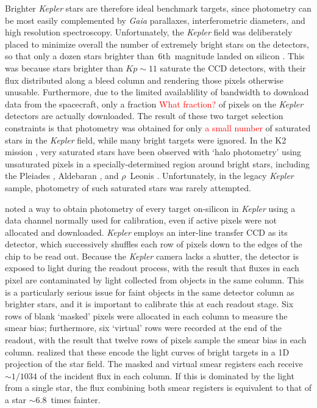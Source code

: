 \documentclass[a4paper,fleqn,usenatbib]{mnras}
\newcommand{\kepler}{\emph{Kepler}\xspace}
\newcommand{\gaia}{\emph{Gaia}\xspace}
\begin{document}
Brighter \kepler stars are therefore ideal benchmark targets, since photometry can be most easily complemented by \gaia parallaxes, interferometric diameters, and high resolution spectroscopy.  
Unfortunately, the \kepler field was deliberately placed to minimize overall the number of extremely bright stars on the detectors, so that only a dozen stars brighter than~6th~magnitude landed on silicon \citep{2010ApJ...713L..79K}. This was because stars brighter than $Kp \sim 11$ saturate the CCD detectors, with their flux distributed along a bleed column and rendering those pixels otherwise unusable. Furthermore, due to the limited availablility of bandwidth to download data from the spacecraft, only a fraction \textcolor{red}{What fraction?} of pixels on the \kepler detectors are actually downloaded. The result of these two target selection constraints is that photometry was obtained for only \textcolor{red}{a small number} of saturated stars in the \kepler field, while many bright targets were ignored. In the K2 mission \citep{k2early}, very saturated stars have been observed with `halo photometry' using unsaturated pixels in a specially-determined region around bright stars, including the Pleiades \citep{halo}, Aldebaran \citep{aldebaran}, and $\rho$~Leonis \citep{rholeo}. Unfortunately, in the legacy \kepler sample, photometry of such saturated stars was rarely attempted.

\citet{orig_smear} noted a way to obtain photometry of every target on-silicon in \kepler using a data channel normally used for calibration, even if active pixels were not allocated and downloaded. \kepler employs an inter-line transfer CCD as its detector, which successively shuffles each row of pixels down to the edges of the chip to be read out. Because the \kepler camera lacks a shutter, the detector is exposed to light during the readout process, with the result that fluxes in each pixel are contaminated by light collected from objects in the same column. This is a particularly serious issue for faint objects in the same detector column as brighter stars, and it is important to calibrate this at each readout stage. Six rows of blank `masked' pixels were allocated in each column to measure the smear bias; furthermore, six `virtual' rows were recorded at the end of the readout, with the result that twelve rows of pixels sample the smear bias in each column. \citet{orig_smear} realized that these encode the light curves of bright targets in a 1D projection of the star field. The masked and virtual smear registers each receive $\sim 1/1034$ of the incident flux in each column. If this is dominated by the light from a single star, the flux combining both smear registers is equivalent to that of a star $\sim 6.8$~times fainter. 
\end{document}
